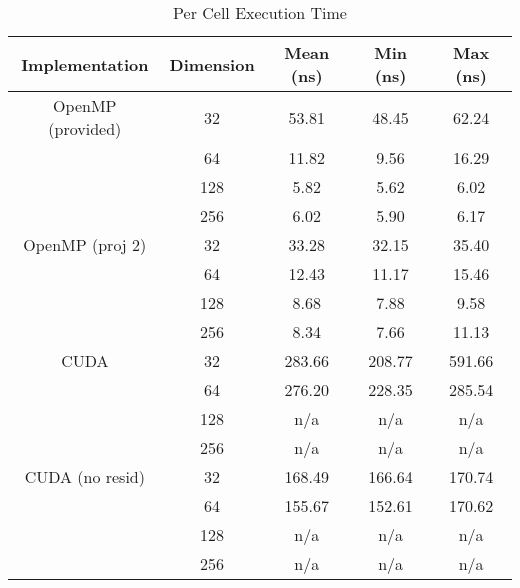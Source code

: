 \documentclass{article}
\begin{document}
  \begin{table}[H]
    \centering

    \begin{tabular}{ c c c c c }
      \toprule
      Implementation    & Dimension & Mean (ns) & Min (ns)  & Max (ns)  \\
      \midrule
      OpenMP (provided) & 32        & 53.81     & 48.45     & 62.24     \\
                        & 64        & 11.82     & 9.56      & 16.29     \\
                        & 128       & 5.82      & 5.62      & 6.02      \\
                        & 256       & 6.02      & 5.90      & 6.17      \\
      \midrule
      OpenMP (proj 2)   & 32        & 33.28     & 32.15     & 35.40     \\
                        & 64        & 12.43     & 11.17     & 15.46     \\
                        & 128       & 8.68      & 7.88      & 9.58      \\
                        & 256       & 8.34      & 7.66      & 11.13     \\
      \midrule
      CUDA              & 32        & 283.66    & 208.77    & 591.66    \\
                        & 64        & 276.20    & 228.35    & 285.54    \\
                        & 128       & n/a       & n/a       & n/a       \\
                        & 256       & n/a       & n/a       & n/a       \\
      \midrule
      CUDA (no resid)   & 32        & 168.49    & 166.64    & 170.74    \\
                        & 64        & 155.67    & 152.61    & 170.62    \\
                        & 128       & n/a       & n/a       & n/a       \\
                        & 256       & n/a       & n/a       & n/a       \\
      \bottomrule
    \end{tabular}
    \caption{Per Cell Execution Time}
    \label{tab:celltime}
  \end{table}
\end{document}
